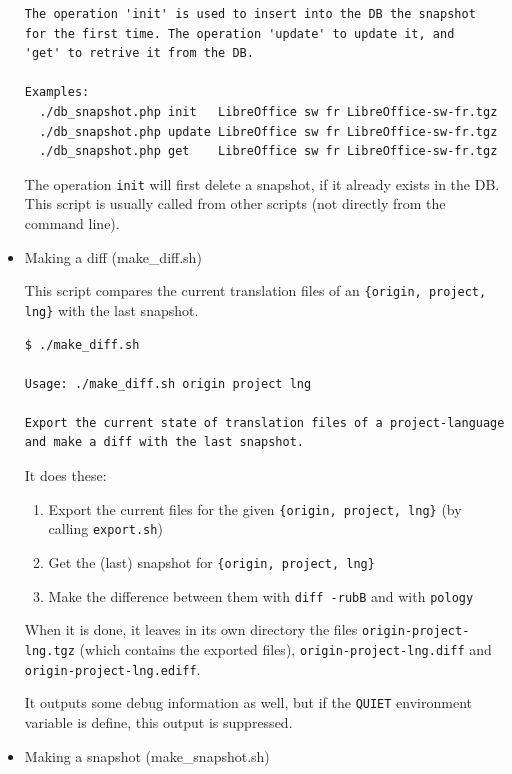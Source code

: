 \documentclass[11pt]{article}
\begin{document}
\begin{itemize}
\begin{verbatim}
The operation 'init' is used to insert into the DB the snapshot
for the first time. The operation 'update' to update it, and
'get' to retrive it from the DB.

Examples:
  ./db_snapshot.php init   LibreOffice sw fr LibreOffice-sw-fr.tgz
  ./db_snapshot.php update LibreOffice sw fr LibreOffice-sw-fr.tgz
  ./db_snapshot.php get    LibreOffice sw fr LibreOffice-sw-fr.tgz
\end{verbatim}



     The operation \texttt{init} will first delete a snapshot, if it already
     exists in the DB. This script is usually called from other scripts
     (not directly from the command line).


\item Making a diff (make\_{}diff.sh)\\
\label{sec-8.4.4.3}


     This script compares the current translation files of an \texttt{\{origin,      project, lng\}} with the last snapshot.
   

\begin{verbatim}
$ ./make_diff.sh

Usage: ./make_diff.sh origin project lng

Export the current state of translation files of a project-language
and make a diff with the last snapshot.
\end{verbatim}



     It does these:
\begin{enumerate}
\item Export the current files for the given \texttt{\{origin, project, lng\}}
        (by calling \texttt{export.sh})
\item Get the (last) snapshot for \texttt{\{origin, project, lng\}}
\item Make the difference between them with \texttt{diff -rubB} and with \texttt{pology}
\end{enumerate}
     When it is done, it leaves in its own directory the files
     \texttt{origin-project-lng.tgz} (which contains the exported files),
     \texttt{origin-project-lng.diff} and \texttt{origin-project-lng.ediff}.

    It outputs some debug information as well, but if the \texttt{QUIET}
    environment variable is define, this output is suppressed.



\item Making a snapshot (make\_{}snapshot.sh)\\
\label{sec-8.4.4.4}




\end{itemize}
\end{document}
